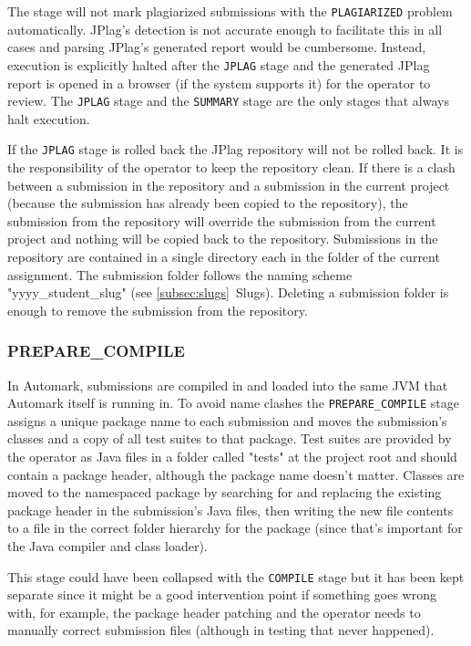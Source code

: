 \documentclass[12pt,a4paper,oneside]{report}
\begin{document}
	The stage will not mark plagiarized submissions with the \lstinline|PLAGIARIZED| problem automatically. JPlag's detection is not accurate enough to facilitate this in all cases and parsing JPlag's generated report would be cumbersome. Instead, execution is explicitly halted after the \lstinline|JPLAG| stage and the generated JPlag report is opened in a browser (if the system supports it) for the operator to review. The \lstinline|JPLAG| stage and the \lstinline|SUMMARY| stage are the only stages that always halt execution.

	If the \lstinline|JPLAG| stage is rolled back the JPlag repository will not be rolled back. It is the responsibility of the operator to keep the repository clean. If there is a clash between a submission in the repository and a submission in the current project (because the submission has already been copied to the repository), the submission from the repository will override the submission from the current project and nothing will be copied back to the repository. Submissions in the repository are contained in a single directory each in the folder of the current assignment. The submission folder follows the naming scheme "yyyy\_student\_slug" (see \ref{subsec:slugs}~Slugs). Deleting a submission folder is enough to remove the submission from the repository.

	\subsubsection{PREPARE\_COMPILE}
	In Automark, submissions are compiled in and loaded into the same JVM that Automark itself is running in. To avoid name clashes the \lstinline|PREPARE_COMPILE| stage assigns a unique package name to each submission and moves the submission's classes and a copy of all test suites to that package. Test suites are provided by the operator as Java files in a folder called "tests" at the project root and should contain a package header, although the package name doesn't matter. Classes are moved to the namespaced package by searching for and replacing the existing package header in the submission's Java files, then writing the new file contents to a file in the correct folder hierarchy for the package (since that's important for the Java compiler and class loader).

	This stage could have been collapsed with the \lstinline|COMPILE| stage but it has been kept separate since it might be a good intervention point if something goes wrong with, for example, the package header patching and the operator needs to manually correct submission files (although in testing that never happened).
\end{document}
